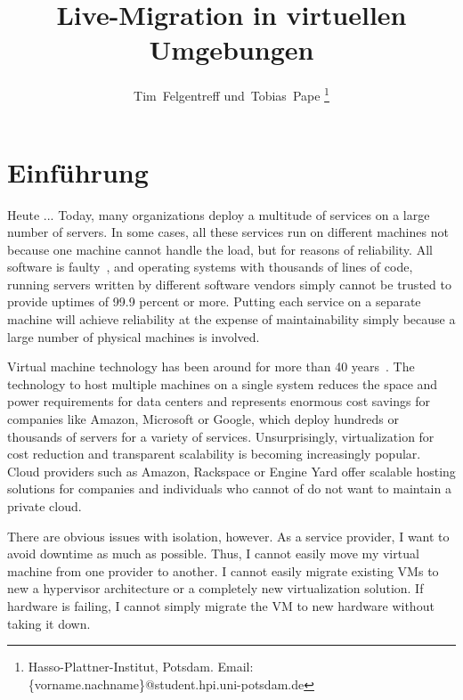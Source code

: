 \documentclass[a4paper,conference,compsoc]{IEEEtran}
\title{Live-Migration in virtuellen Umgebungen}
\author{\IEEEauthorblockN{Tim Felgentreff und Tobias Pape}
  \IEEEauthorblockA{Hasso-Plattner-Institut\\
    Potsdam, Germany\\
    Email: \{vorname.nachname\}@student.hpi.uni-potsdam.de}%
}
\author{Tim~Felgentreff und~Tobias~Pape%
\thanks{%
  Hasso-Plattner-Institut, Potsdam.\goodbreak
  Email: \{vorname.nachname\}@student.hpi.uni-potsdam.de}%
}
\begin{document}
\maketitle

\begin{abstract}
  
\end{abstract}

\IEEEpeerreviewmaketitle


\section{Einführung}
\label{sec:einfuehrung}
Heute ...
Today, many organizations deploy a multitude of services on a large
number of servers. In some cases, all these services run on different
machines not because one machine cannot handle the load, but for
reasons of reliability.  All software is faulty~\cite{zellerprograms},
and operating systems with thousands of lines of code, running servers
written by different software vendors simply cannot be trusted to
provide uptimes of 99.9 percent or more. Putting each service on a
separate machine will achieve reliability at the expense of
maintainability simply because a large number of physical machines is
involved.

Virtual machine technology has been around for more than 40
years~\cite{tanenbaum1992modern}. The technology to host multiple
machines on a single system reduces the space and power requirements
for data centers and represents enormous cost savings for companies
like Amazon, Microsoft or Google, which deploy hundreds or thousands
of servers for a variety of services. Unsurprisingly, virtualization
for cost reduction and transparent scalability is becoming
increasingly popular. Cloud providers such as Amazon, Rackspace or
Engine Yard offer scalable hosting solutions for companies and
individuals who cannot of do not want to maintain a private cloud.

There are obvious issues with isolation, however. As a service
provider, I want to avoid downtime as much as possible. Thus, I cannot
easily move my virtual machine from one provider to another. I cannot
easily migrate existing VMs to new a hypervisor architecture or a
completely new virtualization solution. If hardware is failing, I
cannot simply migrate the VM to new hardware without taking it down.
\end{document}
